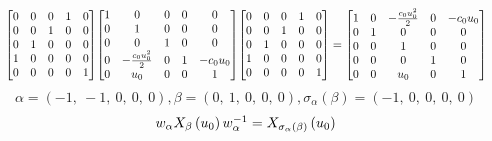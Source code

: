 \documentclass[11pt]{article}
\theoremstyle{definition}
\begin{document}
\[
\scaletoalign{\textwidth}{{\left[\begin{matrix}0 & 0 & 0 & 1 & 0\\0 & 0 & 1 & 0 & 0\\0 & 1 & 0 & 0 & 0\\1 & 0 & 0 & 0 & 0\\0 & 0 & 0 & 0 & 1\end{matrix}\right]} {\left[\begin{matrix}1 & 0 & 0 & 0 & 0\\0 & 1 & 0 & 0 & 0\\0 & 0 & 1 & 0 & 0\\0 & - \frac{c_{0} u_{0}^{2}}{2} & 0 & 1 & - c_{0} u_{0}\\0 & u_{0} & 0 & 0 & 1\end{matrix}\right]} {\left[\begin{matrix}0 & 0 & 0 & 1 & 0\\0 & 0 & 1 & 0 & 0\\0 & 1 & 0 & 0 & 0\\1 & 0 & 0 & 0 & 0\\0 & 0 & 0 & 0 & 1\end{matrix}\right]} = {\left[\begin{matrix}1 & 0 & - \frac{c_{0} u_{0}^{2}}{2} & 0 & - c_{0} u_{0}\\0 & 1 & 0 & 0 & 0\\0 & 0 & 1 & 0 & 0\\0 & 0 & 0 & 1 & 0\\0 & 0 & u_{0} & 0 & 1\end{matrix}\right]}}
\]
\[
\alpha = \left( -1, \  -1, \  0, \  0, \  0\right), \beta = \left( 0, \  1, \  0, \  0, \  0\right), \sigma_{\alpha}(\beta) = \left( -1, \  0, \  0, \  0, \  0\right)
\]
\[
\scaletoalign{\textwidth}{w_{\alpha} X_{\beta}\left(u_{0}\right) w_{\alpha}^{-1} = X_{\sigma_{\alpha}\left(\beta\right)}\left(u_{0}\right)}
\]
\end{document}
